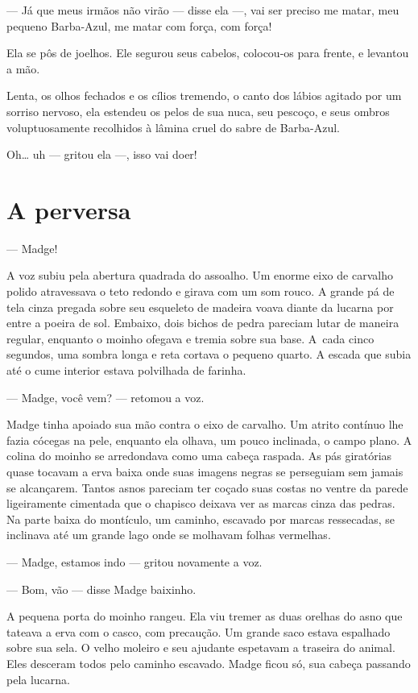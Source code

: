 --- Já que meus irmãos não virão --- disse ela ---, vai ser preciso me matar,
meu pequeno Barba-Azul, me matar com força, com força!

Ela se pôs de joelhos. Ele segurou seus cabelos, colocou-os para
frente, e levantou a mão.

Lenta, os olhos fechados e os cílios tremendo, o canto dos lábios
agitado por um sorriso nervoso, ela estendeu os pelos de sua nuca, seu
pescoço, e seus ombros voluptuosamente recolhidos à lâmina cruel do sabre de
Barba-Azul.

Oh\ldots{} uh --- gritou ela ---, isso vai doer!

\section*{A perversa}

--- Madge!

A voz subiu pela abertura quadrada do assoalho. Um enorme eixo de carvalho
polido atravessava o teto redondo e girava com um som rouco. A grande pá
de tela cinza pregada sobre seu esqueleto de madeira voava diante da
lucarna por entre a poeira de sol. Embaixo, dois bichos de pedra pareciam
lutar de maneira regular, enquanto o moinho ofegava e tremia sobre sua
base. \mbox{A cada} cinco segundos, uma sombra longa e reta cortava o pequeno
quarto. A escada que subia até o cume interior estava polvilhada de
farinha.

--- Madge, você vem? --- retomou a voz.

Madge tinha apoiado sua mão contra o eixo de carvalho. Um atrito
contínuo lhe fazia cócegas na pele, enquanto ela olhava, um pouco
inclinada, o campo plano. A colina do moinho se arredondava como uma
cabeça raspada. As pás giratórias quase tocavam a erva baixa onde suas
imagens negras se perseguiam sem jamais se alcançarem. Tantos asnos
pareciam ter coçado suas costas no ventre da parede ligeiramente cimentada
que o chapisco deixava ver as marcas cinza das pedras. Na parte baixa do
montículo, um caminho, escavado por marcas ressecadas, se inclinava até um
grande lago onde se molhavam folhas vermelhas.

--- Madge, estamos indo --- gritou novamente a voz.

--- Bom, vão --- disse Madge baixinho.

A pequena porta do moinho rangeu. Ela viu tremer as duas orelhas do
asno que tateava a erva com o casco, com precaução. Um grande saco estava
espalhado sobre sua sela. O velho moleiro e seu ajudante espetavam a
traseira do animal. Eles desceram todos pelo caminho escavado. Madge ficou
só, sua cabeça passando pela lucarna.

